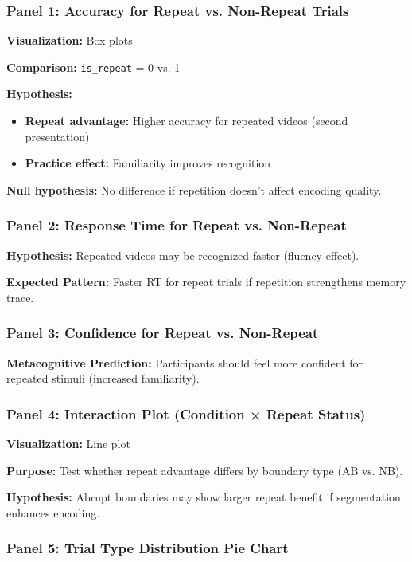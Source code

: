 \documentclass[12pt,a4paper]{article}
\begin{document}
\subsubsection{Panel 1: Accuracy for Repeat vs. Non-Repeat Trials}

\textbf{Visualization:} Box plots

\textbf{Comparison:} \texttt{is\_repeat} = 0 vs. 1

\textbf{Hypothesis:}
\begin{itemize}
    \item \textbf{Repeat advantage:} Higher accuracy for repeated videos (second presentation)
    \item \textbf{Practice effect:} Familiarity improves recognition
\end{itemize}

\textbf{Null hypothesis:} No difference if repetition doesn't affect encoding quality.

\subsubsection{Panel 2: Response Time for Repeat vs. Non-Repeat}

\textbf{Hypothesis:} Repeated videos may be recognized faster (fluency effect).

\textbf{Expected Pattern:} Faster RT for repeat trials if repetition strengthens memory trace.

\subsubsection{Panel 3: Confidence for Repeat vs. Non-Repeat}

\textbf{Metacognitive Prediction:} Participants should feel more confident for repeated stimuli (increased familiarity).

\subsubsection{Panel 4: Interaction Plot (Condition × Repeat Status)}

\textbf{Visualization:} Line plot

\textbf{Purpose:} Test whether repeat advantage differs by boundary type (AB vs. NB).

\textbf{Hypothesis:} Abrupt boundaries may show larger repeat benefit if segmentation enhances encoding.

\subsubsection{Panel 5: Trial Type Distribution Pie Chart}
\end{document}
